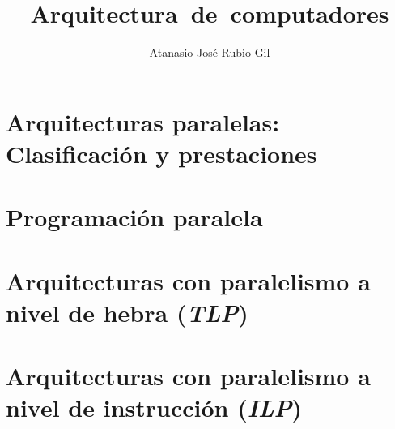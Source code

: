 \documentclass[10pt, a4paper]{aqademic}
\author{Atanasio José Rubio Gil}
\title{Arquitectura~de~computadores}
\begin{document}
\AqMaketitle[cover    = logo-ugr.png,
             org      = Grado en Ingeniería Informática,
             subtitle = Teoría,
             url      = https://github.com/Groctel/ugr-informatica]
\tableofcontents

\chapter{Arquitecturas paralelas: Clasificación y prestaciones}\label{arqpar-clasificacion-prestaciones}
	
	
	

\chapter{Programación paralela}\label{progpar}
	
	
	

\chapter{Arquitecturas con paralelismo a nivel de hebra (\textit{TLP})}\label{tlp}

\chapter{Arquitecturas con paralelismo a nivel de instrucción (\textit{ILP})}\label{ilp}
\end{document}
